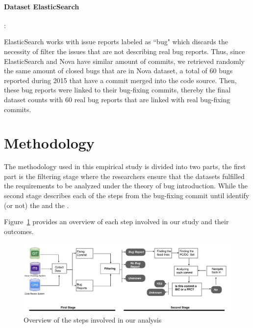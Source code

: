 \documentclass[a4paper, 12pt]{book}
\begin{document}
\paragraph{Dataset ElasticSearch}: 

ElasticSearch works with issue reports labeled as ``bug" which discards the necessity of filter the issues that are not describing real bug reports. Thus, since ElasticSearch and Nova have similar amount of commits, we retrieved randomly the same amount of closed bugs that are in Nova dataset, a total of 60 bugs reported during 2015 that have a commit merged into the code source. Then, these bug reports were linked to their bug-fixing commits, thereby the final dataset counts with 60 real bug reports that are linked with real bug-fixing commits.




\section{Methodology}
\label{sec:methodology}

The methodology used in this empirical study is divided into two parts, the first part is the filtering stage where the researchers ensure that the datasets fulfilled the requirements to be analyzed under the theory of bug introduction. While the second stage describes each of the steps from the bug-fixing commit until identify (or not) the \BIC and the \FFC.

Figure~\ref{fig:diagram} provides an overview of each step involved in our study and their outcomes.

\begin{figure}[ht]
\centering
\includegraphics[width=\columnwidth]{img/diagram.png}
\caption{Overview of the steps involved in our analysis  }
\label{fig:diagram}       %
\end{figure}
\end{document}
